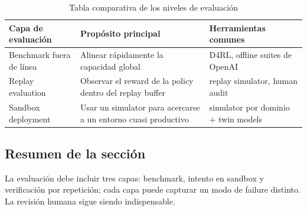 \begin{table}[H]
\centering
\begin{tabular}{p{} p{} p{}}
\toprule
Capa de evaluación & Propósito principal & Herramientas comunes \\
\midrule
Benchmark fuera de línea & Alinear rápidamente la capacidad global & D4RL, offline suites de OpenAI \\
Replay evaluation & Observar el reward de la policy dentro del replay buffer & replay simulator, human audit \\
Sandbox deployment & Usar un simulator para acercarse a un entorno cuasi productivo & simulator por dominio + twin models \\
\bottomrule
\end{tabular}
\caption{Tabla comparativa de los niveles de evaluación}
\end{table}

\subsection{Resumen de la sección}

La evaluación debe incluir tres capas: benchmark, intento en sandbox y verificación por repetición; cada capa puede capturar un modo de failure distinto. La revisión humana sigue siendo indispensable.


